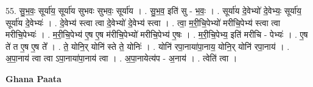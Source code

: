 \documentclass[17pt]{extarticle}
\begin{document}
55. सु॒भ॒वः॒ सूर्या॑य॒ सूर्या॑य सुभवः सुभवः॒ सूर्या॑य । . सु॒भ॒व॒ इति॑ सु - भ॒वः॒ । . सूर्या॑य दे॒वेभ्यो॑ दे॒वेभ्यः॒ सूर्या॑य॒ सूर्या॑य दे॒वेभ्यः॑ । . दे॒वेभ्य॑ स्त्वा त्वा दे॒वेभ्यो॑ दे॒वेभ्य॑ स्त्वा । . त्वा॒ म॒री॒चि॒पेभ्यो॑ मरीचि॒पेभ्य॑ स्त्वा त्वा मरीचि॒पेभ्यः॑ । . म॒री॒चि॒पेभ्य॑ ए॒ष ए॒ष म॑रीचि॒पेभ्यो॑ मरीचि॒पेभ्य॑ ए॒षः । . म॒री॒चि॒पेभ्य॒ इति॑ मरीचि - पेभ्यः॑ । . ए॒ष ते॑ त ए॒ष ए॒ष ते᳚ । . ते॒ योनि॒र् योनि॑ स्ते ते॒ योनिः॑ । . योनि॑ रपा॒नाया॑पा॒नाय॒ योनि॒र् योनि॑ रपा॒नाय॑ । . अ॒पा॒नाय॑ त्वा त्वा ऽपा॒नाया॑पा॒नाय॑ त्वा । . अ॒पा॒नायेत्य॑प - अ॒नाय॑ । . त्वेति॑ त्वा । \newline

\textbf{Ghana Paata } \newline
\end{document}
